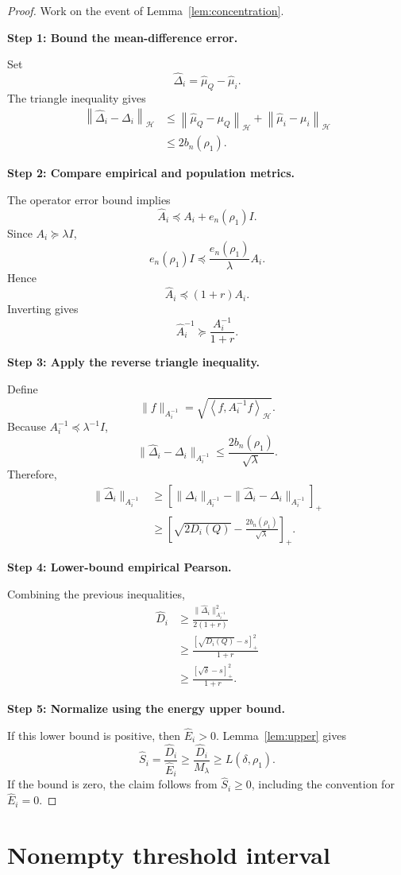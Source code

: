 \documentclass[11pt]{article}
\newcommand{\HH}{\mathcal H}
\newcommand{\inner}[2]{\left\langle #1,#2\right\rangle_{\HH}}
\newcommand{\norm}[1]{\left\lVert #1\right\rVert_{\HH}}
\newcommand{\proofstep}[1]{%
  \par\smallskip
  \noindent\textbf{#1}\enspace\ignorespaces
}
\begin{document}
\begin{proof}
Work on the event of Lemma~\ref{lem:concentration}.

\proofstep{Step 1: Bound the mean-difference error.}
Set
\[
\widehat\Delta_i=\widehat\mu_Q-\widehat\mu_i.
\]
The triangle inequality gives
\[
\begin{aligned}
\norm{\widehat\Delta_i-\Delta_i}
&\le
\norm{\widehat\mu_Q-\mu_Q}
+\norm{\widehat\mu_i-\mu_i}\\
&\le2b_n(\rho_1).
\end{aligned}
\]

\proofstep{Step 2: Compare empirical and population metrics.}
The operator error bound implies
\[
\widehat A_i\preceq A_i+e_n(\rho_1)I.
\]
Since $A_i\succeq\lambda I$,
\[
e_n(\rho_1)I
\preceq\frac{e_n(\rho_1)}{\lambda}A_i.
\]
Hence
\[
\widehat A_i
\preceq(1+r)A_i.
\]
Inverting gives
\[
\widehat A_i^{-1}
\succeq\frac{A_i^{-1}}{1+r}.
\]

\proofstep{Step 3: Apply the reverse triangle inequality.}
Define
\[
\|f\|_{A_i^{-1}}
=\sqrt{\inner{f}{A_i^{-1}f}}.
\]
Because $A_i^{-1}\preceq\lambda^{-1}I$,
\[
\|\widehat\Delta_i-\Delta_i\|_{A_i^{-1}}
\le\frac{2b_n(\rho_1)}{\sqrt\lambda}.
\]
Therefore,
\[
\begin{aligned}
\|\widehat\Delta_i\|_{A_i^{-1}}
&\ge
\left[
\|\Delta_i\|_{A_i^{-1}}
-\|\widehat\Delta_i-\Delta_i\|_{A_i^{-1}}
\right]_+\\
&\ge
\left[
\sqrt{2D_i(Q)}
-\frac{2b_n(\rho_1)}{\sqrt\lambda}
\right]_+.
\end{aligned}
\]

\proofstep{Step 4: Lower-bound empirical Pearson.}
Combining the previous inequalities,
\[
\begin{aligned}
\widehat D_i
&\ge
\frac{\|\widehat\Delta_i\|_{A_i^{-1}}^2}
{2(1+r)}\\
&\ge
\frac{[\sqrt{D_i(Q)}-s]_+^2}
{1+r}\\
&\ge
\frac{[\sqrt\delta-s]_+^2}
{1+r}.
\end{aligned}
\]

\proofstep{Step 5: Normalize using the energy upper bound.}
If this lower bound is positive, then $\widehat E_i>0$.
Lemma~\ref{lem:upper} gives
\[
\widehat S_i
=\frac{\widehat D_i}{\widehat E_i}
\ge\frac{\widehat D_i}{M_\lambda}
\ge L(\delta,\rho_1).
\]
If the bound is zero, the claim follows from
$\widehat S_i\ge0$, including the convention for
$\widehat E_i=0$.
\end{proof}

\section{Nonempty threshold interval}
\end{document}
